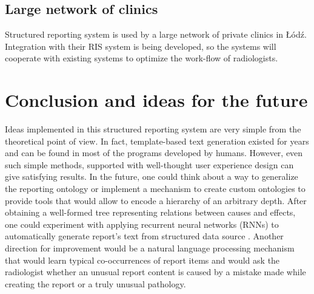 \documentclass[12pt, twoside, openany]{report}
\theoremstyle{definition}
\begin{document}
\section{Large network of clinics}
Structured reporting system is used by a large network of private clinics in Łódź. Integration with their RIS system is being developed, so the systems will cooperate with existing systems to optimize the work-flow of radiologists.


\chapter{Conclusion and ideas for the future}
Ideas implemented in this structured reporting system are very simple from the theoretical point of view. In fact, template-based text generation existed for years and can be found in most of the programs developed by humans. However, even such simple methods, supported with well-thought user experience design can give satisfying results. 
In the future, one could think about a way to generalize the reporting ontology or implement a mechanism to create custom ontologies to provide tools that would allow to encode a hierarchy of an arbitrary depth. After obtaining a well-formed tree representing relations between causes and effects, one could experiment with applying recurrent neural networks (RNNs) to automatically generate report's text from structured data source \cite{recurrent-neural-networks}. Another direction for improvement would be a natural language processing mechanism that would learn typical co-occurrences of report items and would ask the radiologist whether an unusual report content is caused by a mistake made while creating the report or a truly unusual pathology. 


\end{document}
